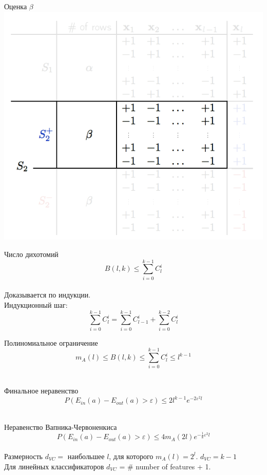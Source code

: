 \documentclass[10pt]{beamer}
\begin{document}
\begin{frame}{Оценка $\beta$}  
  \centering
  \includegraphics[width=\textwidth, height=0.8 \textheight, keepaspectratio]{images/breakpoint2}
\end{frame}

\begin{frame}{Число дихотомий}  
  $$B(l, k) \leq \sum\limits_{i=0}^{k-1} C_l^i$$\\
  Доказывается по индукции.\\
  Индукционный шаг:
  $$\sum\limits_{i=0}^{k-1} C_l^i = \sum\limits_{i=0}^{k-1} C_{l-1}^i + \sum\limits_{i=0}^{k-2} C_l^i$$
\end{frame}

\begin{frame}{Полиномиальное ограничение}  
  $$m_{A}(l) \leq B(l, k) \leq \sum\limits_{i=0}^{k-1} C_l^i \leq l^{k-1}$$\\
\end{frame}

\begin{frame}{Финальное неравенство}  
  $$P(E_{in}(a) - E_{out}(a) > \varepsilon) \leq 2 l^{k-1} e^{-2 \varepsilon^2 l}$$\\
\end{frame}

\begin{frame}{Неравенство Вапника-Червоненкиса}  
  $$P(E_{in}(a) - E_{out}(a) > \varepsilon) \leq 4 m_{A}(2l) e^{-\frac{1}{8}\varepsilon^2l}$$\\
  \bigbreak
  Размерность $d_{VC} = $ наибольшее $l$, для которого $m_{A}(l) = 2^l$. $d_{VC} = k-1$\\
  \bigbreak
  Для линейных классификаторов $d_{VC}$ = \# number of features + 1.  
\end{frame}
\end{document}
